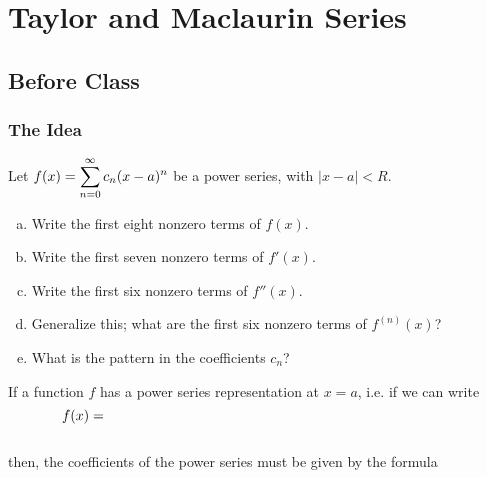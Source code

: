 \documentclass[notes]{subfiles}
\begin{document}
	\fancyhead[LO,RE]{\bfseries \small \currentname}
	\fancyfoot[C]{{}}
	\fancyfoot[RO,LE]{\large \thepage}	%
	
\section*{Taylor and Maclaurin Series}\label{cs1110}
	\subsection*{Before Class}
	\subsubsection*{The Idea}
		\begin{ex}
			Let $f(x) = \displaystyle \sum_{n = 0}^\infty c_n(x-a)^n$ be a power series, with $|x-a| < R$.
			\begin{enumerate}[(a)]
				\item Write the first eight nonzero terms of $f(x)$.
					
				\item Write the first seven nonzero terms of $f'(x)$.
					
				\item Write the first six nonzero terms of $f''(x)$.
					
				\item Generalize this; what are the first six nonzero terms of $f^{(n)}(x)$?
					
				\item What is the pattern in the coefficients $c_n$?	

			\end{enumerate}
		\end{ex}
			\newpage
		
		\begin{thm}
			If a function $f$ has a power series representation at $x =a$, i.e. if we can write \\[15pt]
				\[f(x) = \hspace{3.5in}\]
				\\[10pt]
			then, the coefficients of the power series must be given by the formula\\[20pt]
				\[\]
		\end{thm}	
		
\end{document}

